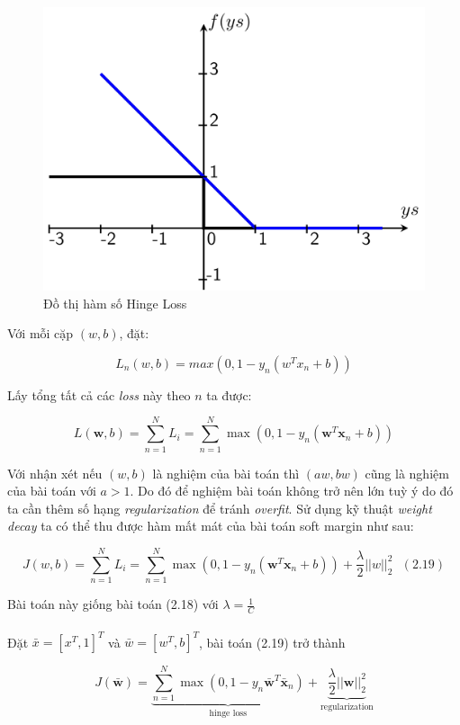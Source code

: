 \documentclass[a4paper, 12pt, oneside]{report}
\begin{document}
 \begin{center}
    \begin{figure}[H]
    \begin{center}
     \includegraphics[scale=0.08]{hinge.png}
    \end{center}
    \caption{Đồ thị hàm số Hinge Loss}
    \label{refhinh1}
    \end{figure}
\end{center}
Với mỗi cặp $(w,b)$, đặt:
\begin{mybox}
$$ L_n(w,b) = max(0, 1- y_n(w^Tx_n + b)) $$
\end{mybox}
Lấy tổng tất cả các \textit{loss} này theo $n$ ta được: 
\begin{mybox}
$$ L(\mathbf{w}, b) = \sum_{n=1}^N L_i = \sum_{n=1}^N \max(0, 1 - y_n(\mathbf{w}^T\mathbf{x}_n + b)) $$ \end{mybox}
Với nhận xét nếu $(w,b)$ là nghiệm của bài toán thì $(aw,bw)$ cũng là nghiệm của bài toán với $a >1$. Do đó để nghiệm bài toán không trở nên lớn tuỳ ý do đó ta cần thêm số hạng \textit{regularization} để tránh \textit{overfit}. Sử dụng kỹ thuật \textit{weight decay} ta có thể thu được hàm mất mát của bài toán soft margin như sau: 
\begin{mybox}
$$ J(w,b) = \sum_{n=1}^N L_i = \sum_{n=1}^N \max(0, 1 - y_n(\mathbf{w}^T\mathbf{x}_n + b)) + \frac{\lambda}{2} ||w||^2_2 ~~~(2.19)$$ \end{mybox}
Bài toán này giống bài toán (2.18) với $\lambda = \frac{1}{C}$\\ \\
Đặt $\bar{x} = [x^T,1]^T$ và $\bar{w} = [w^T,b]^T$, bài toán (2.19) trở thành\\
\begin{mybox}
$$J(\mathbf{\bar{w}}) = \underbrace{\sum_{n=1}^N \max(0, 1 - y_n\bar{\mathbf{w}}^T\mathbf{\bar{x}}_n)}_{\text{hinge loss}} + \underbrace{\frac{\lambda}{2} ||\mathbf{w}||_2^2}_{\text{regularization}} $$ \end{mybox}
\end{document}
